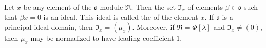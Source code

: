 Let $x$ be any element of the $\mathfrak{o}$-module $\mathfrak{R}$. Then the set $\mathfrak{I}_x$ of elements $\beta \in \mathfrak{o}$ such that $\beta x = 0$ is an ideal. This ideal is called the  of the element $x$. If $\mathfrak{o}$ is a principal ideal domain, then $\mathfrak{I}_x = (\mu_x)$. Moreover, if $\mathfrak{R} = \Phi[\lambda]$ and $\mathfrak{I}_x \neq (0)$, then $\mu_x$ may be normalized to have leading coefficient $1$.
